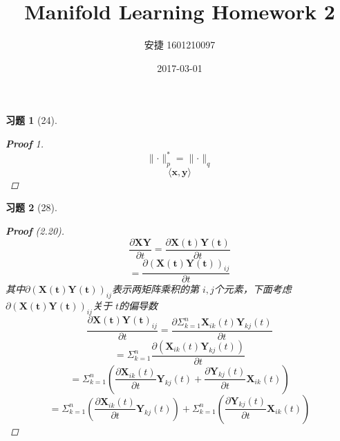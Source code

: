 \documentclass[a4paper, UTF8]{ctexart}
\title{Manifold Learning Homework 2}
\date{2017-03-01}
\author{安捷 1601210097}
\newtheorem*{exercise}{\textbf{习题}}
\begin{document}
\maketitle
\begin{exercise}[24]
  \begin{proof}[\textbf{Proof} 1]
    \begin{equation*}
      \lVert \cdot \rVert_p^* = \lVert \cdot \rVert_q
    \end{equation*}
    \begin{equation*}
      \langle \mathbf{x}, \mathbf{y} \rangle
    \end{equation*}
  \end{proof}
\end{exercise}
\begin{exercise}[28]
	\begin{proof}[\textbf{Proof} (2.20)]
		\begin{equation*}
			\frac{\partial \mathbf{XY}}{\partial t} = \frac{\partial \mathbf{X \left(t\right)}\mathbf{Y \left(t\right)}}{\partial t}
		\end{equation*}
		\begin{equation*}
			= \frac{ \partial \left( \mathbf{X \left( t \right) Y \left( t \right)} \right)_{ij} }{\partial t}
		\end{equation*}
		其中$\partial \left( \mathbf{X \left( t \right) Y \left( t \right)} \right)_{ij}$表示两矩阵乘积的第 $i,j$个元素，下面考虑$\partial \left( \mathbf{X \left( t \right) Y \left( t \right)} \right)_{ij}$关于 $t$的偏导数
		\begin{equation*}
			\frac{\partial \mathbf{X \left( t \right) Y \left( t \right)}_{ij} }{\partial t} = \frac{\partial \Sigma_{k=1}^n \mathbf{X}_{ik} \left( t \right)\mathbf{Y}_{kj} \left( t \right)}{\partial t}
		\end{equation*}
		\begin{equation*}
			= \Sigma_{k=1}^n \frac{\partial \left( \mathbf{X}_{ik}\left( t \right)\mathbf{Y}_{kj}\left( t \right) \right)}{\partial t}
		\end{equation*}
		\begin{equation*}
			= \Sigma_{k=1}^n\left( \frac{\partial\mathbf{X}_{ik}\left(t\right)}{\partial t}\mathbf{Y}_{kj}\left( t \right) + \frac{\partial \mathbf{Y}_{kj}\left( t \right)}{\partial t}\mathbf{X}_{ik}\left( t \right)\right)
		\end{equation*}
		\begin{equation*}
			= \Sigma_{k=1}^n \left( \frac{\partial \mathbf{X}_{ik} \left( t \right) }{\partial t}\mathbf{Y}_{kj}\left( t \right) \right) + \Sigma_{k=1}^n \left( \frac{\partial \mathbf{Y}_{kj}\left( t \right)}{\partial t} \mathbf{X}_{ik}\left( t \right)\right)

\end{equation*}
\end{proof}
\end{exercise}
\end{document}
